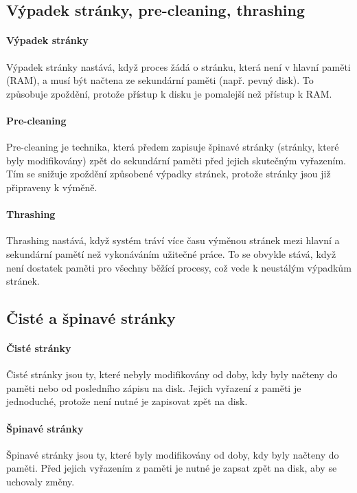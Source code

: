 \subsection{Výpadek stránky, pre-cleaning, thrashing}

\paragraph{Výpadek stránky}
Výpadek stránky nastává, když proces žádá o stránku, která není v hlavní paměti (RAM), a musí být načtena ze sekundární paměti (např. pevný disk). To způsobuje zpoždění, protože přístup k disku je pomalejší než přístup k RAM.

\paragraph{Pre-cleaning}
Pre-cleaning je technika, která předem zapisuje špinavé stránky (stránky, které byly modifikovány) zpět do sekundární paměti před jejich skutečným vyřazením. Tím se snižuje zpoždění způsobené výpadky stránek, protože stránky jsou již připraveny k výměně.

\paragraph{Thrashing}
Thrashing nastává, když systém tráví více času výměnou stránek mezi hlavní a sekundární pamětí než vykonáváním užitečné práce. To se obvykle stává, když není dostatek paměti pro všechny běžící procesy, což vede k neustálým výpadkům stránek.

\subsection{Čisté a špinavé stránky}

\paragraph{Čisté stránky}
Čisté stránky jsou ty, které nebyly modifikovány od doby, kdy byly načteny do paměti nebo od posledního zápisu na disk. Jejich vyřazení z paměti je jednoduché, protože není nutné je zapisovat zpět na disk.

\paragraph{Špinavé stránky}
Špinavé stránky jsou ty, které byly modifikovány od doby, kdy byly načteny do paměti. Před jejich vyřazením z paměti je nutné je zapsat zpět na disk, aby se uchovaly změny.

